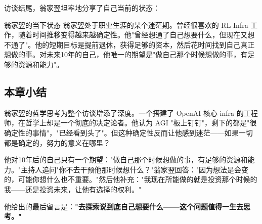 访谈结尾，翁家翌坦率地分享了自己当前的状态：

\begin{knowledgebox}{翁家翌的当下状态}
翁家翌处于职业生涯的某个迷茫期。曾经很喜欢的 RL Infra 工作，随着时间推移变得越来越确定性。他"曾经想通了自己想要什么，但现在又想不通了"。他的短期目标是提前退休，获得足够的资本，然后花时间找到自己真正想做的事。对未来10年的自己，他唯一的期望是"做自己那个时候想做的事，有足够的资源和能力"。
\end{knowledgebox}

\subsection{本章小结}

翁家翌的哲学思考为整个访谈增添了深度。一个搭建了 OpenAI 核心 infra 的工程师，在哲学上却是一个彻底的决定论者。他认为 AGI "板上钉钉"，剩下的都是"很确定性的事情"，"已经看到头了"。但这种确定性反而让他感到迷茫——如果一切都是确定的，努力的意义在哪里？

他对10年后的自己只有一个期望："做自己那个时候想做的事，有足够的资源和能力。"主持人追问"你不去干预他那时候想什么？"翁家翌回答："因为想法是会变的，可能你想什么也不重要。"然后他补充："我现在所能做的就是投资那个时候的我——还是投资未来，让他有选择的权利。"

他给出的最后留言是：\textbf{"去探索说到底自己想要什么——这个问题值得一生去思考。"}


